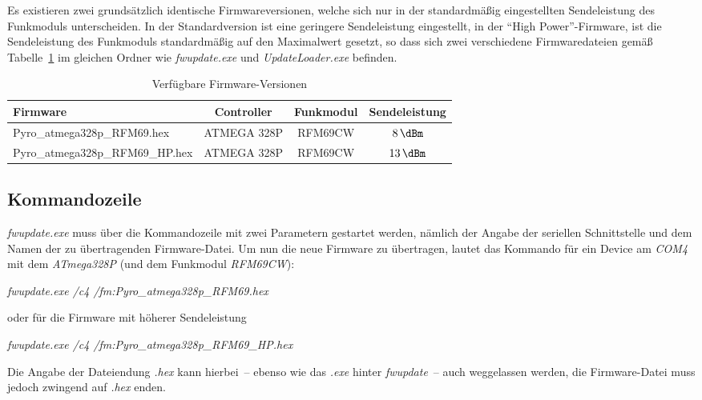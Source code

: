 \documentclass[paper=a4, parskip, numbers=noenddot, toc=listof, headsepline]{scrbook}
\begin{document}
				Es existieren zwei grundsätzlich identische Firmwareversionen, welche sich nur in der standardmäßig eingestellten Sendeleistung des Funkmoduls unterscheiden. In der Standardversion ist eine geringere Sendeleistung eingestellt, in der \enquote{High Power}-Firmware, ist die Sendeleistung des Funkmoduls standardmäßig auf den Maximalwert gesetzt, so dass sich zwei verschiedene Firmwaredateien gemäß Tabelle~\ref{tab:firmwareversions} im gleichen Ordner wie \emph{fwupdate.exe} und \emph{UpdateLoader.exe} befinden.

				\begin{table}
					\centering
					\begin{tabularx}{.925\textwidth}{Xccc}
						\hline\hline
						Firmware                        & Controller  & Funkmodul & Sendeleistung   \\ \hline
						Pyro\_atmega328p\_RFM69.hex     & ATMEGA 328P & RFM69CW   & $\SI{8}{\dBm}$  \\
						Pyro\_atmega328p\_RFM69\_HP.hex & ATMEGA 328P & RFM69CW   & $\SI{13}{\dBm}$ \\ \hline\hline
					\end{tabularx}
					\caption{Verfügbare Firmware-Versionen}
					\label{tab:firmwareversions}
				\end{table}

				\subsection{Kommandozeile}

					\emph{fwupdate.exe} muss über die Kommandozeile mit zwei Parametern gestartet werden, nämlich der Angabe der seriellen Schnittstelle und dem Namen der zu übertragenden Firmware-Datei. Um nun die neue Firmware zu übertragen, lautet das Kommando für ein Device am \emph{COM4} mit dem \emph{ATmega328P} (und dem Funkmodul \emph{RFM69CW}):

					\begin{center}
						\emph{fwupdate.exe /c4 /fm:Pyro\_atmega328p\_RFM69.hex}
					\end{center}

					oder für die Firmware mit höherer Sendeleistung

					\begin{center}
						\emph{fwupdate.exe /c4 /fm:Pyro\_atmega328p\_RFM69\_HP.hex}
					\end{center}

					Die Angabe der Dateiendung \emph{.hex} kann hierbei~-- ebenso wie das \emph{.exe} hinter \emph{fwupdate}~-- auch weggelassen werden, die Firmware-Datei muss jedoch zwingend auf \emph{.hex} enden.
\end{document}
